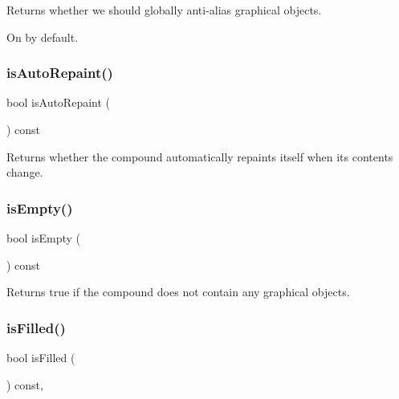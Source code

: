 Returns whether we should globally anti-\/alias graphical objects. 

On by default. \mbox{\label{classGCompound_a12c8d52ddfcaa5448ec4bace92ddee6c}} 
\subsubsection{\texorpdfstring{is\+Auto\+Repaint()}{isAutoRepaint()}}
{\footnotesize\ttfamily bool is\+Auto\+Repaint (\begin{DoxyParamCaption}{ }\end{DoxyParamCaption}) const\hspace{0.3cm}{\ttfamily [virtual]}}



Returns whether the compound automatically repaints itself when its contents change. 

\mbox{\label{classGCompound_acf82f9b2937375c7b1cf3dccb3df3312}} 
\subsubsection{\texorpdfstring{is\+Empty()}{isEmpty()}}
{\footnotesize\ttfamily bool is\+Empty (\begin{DoxyParamCaption}{ }\end{DoxyParamCaption}) const\hspace{0.3cm}{\ttfamily [virtual]}}



Returns true if the compound does not contain any graphical objects. 

\mbox{\label{classGObject_a11c404f106940c201b6f326e0355c150}} 
\subsubsection{\texorpdfstring{is\+Filled()}{isFilled()}}
{\footnotesize\ttfamily bool is\+Filled (\begin{DoxyParamCaption}{ }\end{DoxyParamCaption}) const\hspace{0.3cm}{\ttfamily [virtual]}, {\ttfamily [inherited]}}



